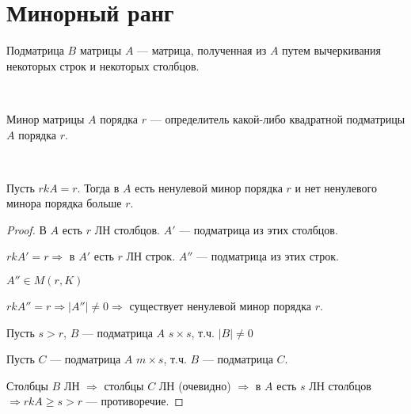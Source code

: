 \section{Минорный ранг}

\begin{conj} 
    Подматрица $B$ матрицы $A$ --- матрица, полученная из $A$ путем вычеркивания некоторых строк и некоторых столбцов.
\end{conj}
\
\begin{conj} 
    Минор матрицы $A$ порядка $r$ --- определитель какой-либо квадратной подматрицы $A$ порядка $r$.
\end{conj}
\
\begin{theorem-non} 
    
    Пусть $rk A = r$. Тогда в $A$ есть ненулевой минор порядка $r$ и нет ненулевого минора порядка больше $r$.

    \begin{proof}
        
        В $A$ есть $r$ ЛН столбцов. $A'$ --- подматрица из этих столбцов.

        $rk A' = r \Longrightarrow$ в $A'$ есть $r$ ЛН строк. $A''$ --- подматрица из этих строк.

        $A'' \in M(r, K)$

        $rk A'' = r \Longrightarrow |A''| \neq 0 \Longrightarrow$ существует ненулевой минор порядка $r$.

        Пусть $s > r$, $B$ --- подматрица $A$ $s \times s$, т.ч. $|B| \neq 0$

        Пусть $C$ --- подматрица $A$ $m \times s$, т.ч. $B$ --- подматрица $C$.

        Столбцы $B$ ЛН $\Longrightarrow$ столбцы $C$ ЛН (очевидно) $\Longrightarrow$ в $A$ есть $s$ ЛН столбцов $\Longrightarrow rk A \geq s > r$ --- противоречие.

    \end{proof}

\end{theorem-non}

